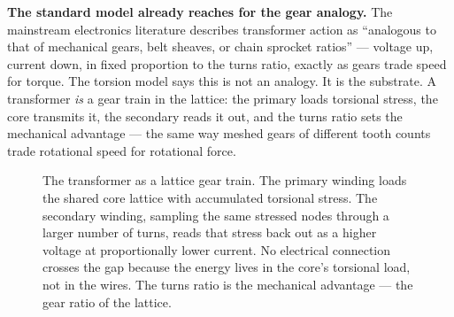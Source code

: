 \documentclass[11pt, letterpaper, openany]{book}
\begin{document}
\begin{empiricalbox}
\textbf{The standard model already reaches for the gear analogy.}
The mainstream electronics literature describes transformer action as
``analogous to that of mechanical gears, belt sheaves, or chain sprocket
ratios'' --- voltage up, current down, in fixed proportion to the turns
ratio, exactly as gears trade speed for torque. The torsion model says this
is not an analogy. It is the substrate. A transformer \emph{is} a gear
train in the lattice: the primary loads torsional stress, the core
transmits it, the secondary reads it out, and the turns ratio sets the
mechanical advantage --- the same way meshed gears of different tooth
counts trade rotational speed for rotational force.
\end{empiricalbox}
 
\begin{figure}[H]
\centering
{}
\caption{The transformer as a lattice gear train. The primary winding loads
the shared core lattice with accumulated torsional stress. The secondary
winding, sampling the same stressed nodes through a larger number of turns,
reads that stress back out as a higher voltage at proportionally lower
current. No electrical connection crosses the gap because the energy lives
in the core's torsional load, not in the wires. The turns ratio is the
mechanical advantage --- the gear ratio of the lattice.}
\end{figure}
 
\end{document}
